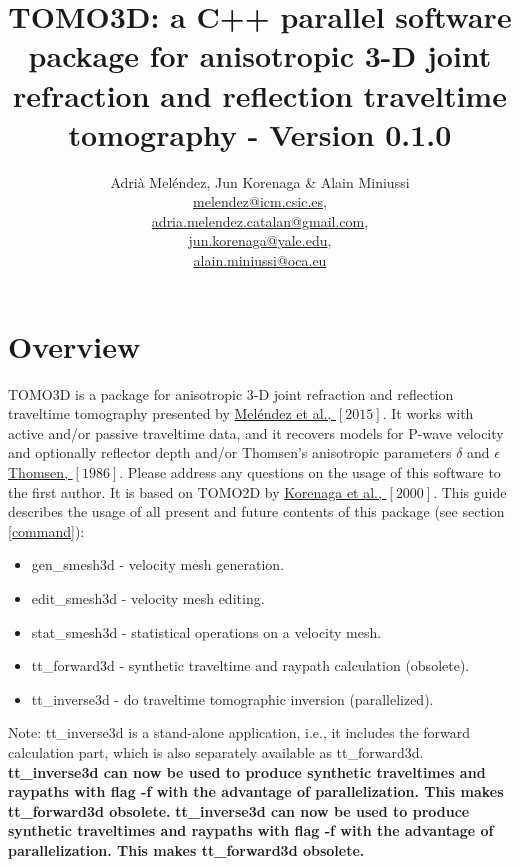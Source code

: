 \documentclass[twoside,final,onecolumn]{article}
\begin{document}
\title{TOMO3D: a C++ parallel software package for anisotropic 3-D joint refraction and reflection traveltime tomography - Version 0.1.0} 

\author{Adri\`{a} Mel\'{e}ndez, Jun Korenaga \& Alain Miniussi\\
  \href{mailto:melendez@icm.csic.es}{melendez@icm.csic.es},\\
  \href{mailto:adria.melendez.catalan@gmail.com}{adria.melendez.catalan@gmail.com},\\
  \href{mailto:jun.korenaga@yale.edu}{jun.korenaga@yale.edu}, \\
  \href{mailto:alain.miniussi@oca.eu}{alain.miniussi@oca.eu} \\
}
\maketitle

\tableofcontents

\section{Overview}
TOMO3D is a package for anisotropic 3-D joint refraction and reflection traveltime tomography presented by 
\href{http://www.dx.doi.org/10.1093/gji/ggv292}{Mel\'{e}ndez et al., $[2015]$}. It works with active and/or passive traveltime data,  
and it recovers models for P-wave velocity and optionally reflector depth and/or Thomsen's anisotropic parameters $\delta$ and $\epsilon$ 
\href{http://dx.doi.org/10.1190/1.1442051}{Thomsen, $[1986]$}.
Please address any questions on the usage of this software to the first author. 
It is based on TOMO2D by \href{http://www.dx.doi.org/10.1029/2000JB900188}{Korenaga et al., $[2000]$}.
This guide describes the usage of all present and future contents of this package (see section \ref{command}):

\begin{itemize}
\item gen\_smesh3d - velocity mesh generation.
\item edit\_smesh3d - velocity mesh editing.
\item stat\_smesh3d - statistical operations on a velocity mesh.
\item tt\_forward3d - synthetic traveltime and raypath calculation (obsolete).
\item tt\_inverse3d - do traveltime tomographic inversion (parallelized).
\end{itemize}
Note: tt\_inverse3d is a stand-alone application, i.e., it includes the forward calculation part, which is also separately available as tt\_forward3d. 
\textbf{tt\_inverse3d can now be used to produce synthetic traveltimes and raypaths with flag -f with the advantage of parallelization.
This makes tt\_forward3d obsolete.}
\textbf{tt\_inverse3d can now be used to produce synthetic traveltimes and raypaths with flag -f with the advantage of parallelization.
This makes tt\_forward3d obsolete.}
\end{document}

